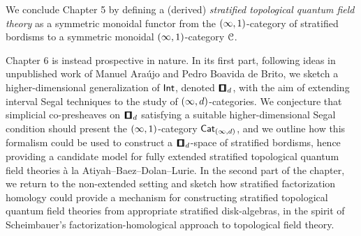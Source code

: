 We conclude Chapter 5 by defining a (derived) \emph{stratified topological quantum field theory} as a symmetric monoidal functor from the $(\operatorname{\infty},1)$-category of stratified bordisms to a symmetric monoidal $(\operatorname{\infty},1)$-category $\mathcal C$.

Chapter 6 is instead prospective in nature. In its first part, following ideas in unpublished work of Manuel Araújo and Pedro Boavida de Brito, we sketch a higher-dimensional generalization of $\operatorname{\mathsf{Int}}$, denoted $\cube_d$, with the aim of extending interval Segal techniques to the study of $(\operatorname{\infty},d)$-categories. We conjecture that simplicial co-presheaves on $\cube_d$ satisfying a suitable higher-dimensional Segal condition should present the $(\operatorname{\infty},1)$-category $\operatorname{{\sf Cat}}_{(\operatorname{\infty},d)}$, and we outline how this formalism could be used to construct a $\cube_d$-space of stratified bordisms, hence providing a candidate model for fully extended stratified topological quantum field theories \`a la Atiyah--Baez--Dolan--Lurie. In the second part of the chapter, we return to the non-extended setting and sketch how stratified factorization homology could provide a mechanism for constructing stratified topological quantum field theories from appropriate stratified disk-algebras, in the spirit of Scheimbauer's factorization-homological approach to topological field theory.
